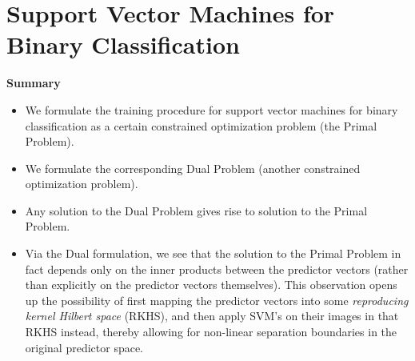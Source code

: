 
\section{Support Vector Machines for Binary Classification}
\setcounter{theorem}{0}

\vskip 0.5cm
\noindent
\textbf{Summary}
\begin{itemize}
\item
	We formulate the training procedure for support vector machines for binary classification
	as a certain constrained optimization problem (the Primal Problem).
\item
	We formulate the corresponding Dual Problem (another constrained optimization problem).
\item
	Any solution to the Dual Problem gives rise to solution to the Primal Problem.
\item
	Via the Dual formulation, we see that the solution to the Primal Problem in fact
	depends only on the inner products between the predictor vectors
	(rather than explicitly on the predictor vectors themselves).
	This observation opens up the possibility of first mapping the predictor vectors
	into some \textit{reproducing kernel Hilbert space} (RKHS), and then
	apply SVM's on their images in that RKHS instead,
	thereby allowing for non-linear separation boundaries in the original predictor space.
\end{itemize}

